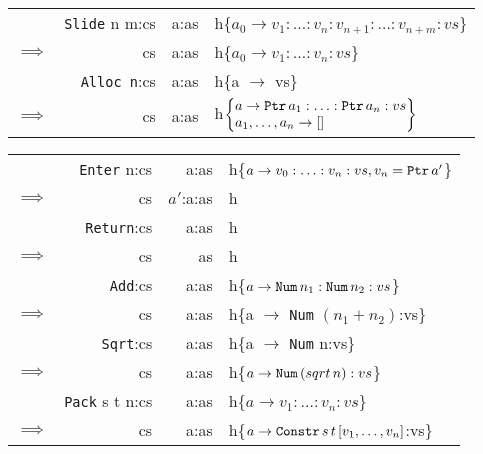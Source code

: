 \documentclass[10pt, a4paper]{article}
\begin{document}
\begin{center}
\begin{tabular}{|rrrl|}
& \verb|Slide| n m:cs & a:as &
            h\{$a_{0} \rightarrow
                v_{1}:\ldots:v_{n}:v_{n+1}:\ldots:v_{n+m}:vs$\} \\
$\implies$ & cs & a:as & h\{$a_{0} \rightarrow v_{1}:\ldots:v_{n}:vs$\} \\
\hline

& \verb|Alloc n|:cs & a:as & h\{a $\rightarrow$ vs\} \\ 
$\implies$ & cs & a:as & h$\left\lbrace
                \begin{array}{@{}l@{}}a \rightarrow \verb|Ptr| \, a_{1}: \ldots :\verb|Ptr| \, a_{n}:vs \\
                                   a_{1}, \ldots, a_{n} \rightarrow []
                \end{array}
              \right\rbrace$ \\ 
\hline


\end{tabular}






\begin{tabular}{|rrrl|} 

\hline

& \verb|Enter| n:cs & a:as & h\{$a \rightarrow v_{0}:\ldots:v_{n}:vs, v_{n} = \verb|Ptr| \, a'$\} \\ 
$\implies$ & cs & $a'$:a:as & h \\
\hline

& \verb|Return|:cs & a:as & h \\ 
$\implies$ & cs & as & h \\ 
\hline

& \verb|Add|:cs & a:as & h\{$a \rightarrow \verb|Num| \, n_{1}:\verb|Num| \, n_{2}:vs$\} \\ 
$\implies$ & cs & a:as & h\{a $\rightarrow$ \verb|Num| $(n_{1}+n_{2})$:vs\} \\ 
\hline

& \verb|Sqrt|:cs & a:as & h\{a $\rightarrow$ \verb|Num| n:vs\} \\ 
$\implies$ & cs & a:as & h\{$a \rightarrow \verb|Num| \, (sqrt \, n):vs$\} \\ 
\hline

& \verb|Pack| s t n:cs & a:as & h\{$a \rightarrow v_{1}:\ldots:v_{n}:vs$\} \\
$\implies$ & cs & a:as & h\{$a \rightarrow \verb|Constr| \, s \, t \, [v_{1}, \ldots, v_{n}]$:vs\} \\
\hline


\end{tabular}
\end{center}
\end{document}
